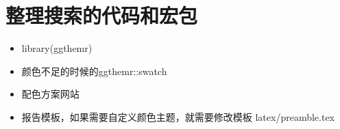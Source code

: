 \documentclass[hyperref, a4paper, UTF8, zihao = -4, linespread = 1]{ctexbook}
\newenvironment{Shaded}{\begin{snugshade}}{\end{snugshade}}
\newcommand{\DecValTok}[1]{\textcolor[rgb]{0.00,0.00,0.81}{#1}}
\newcommand{\NormalTok}[1]{#1}
\newcommand{\OperatorTok}[1]{\textcolor[rgb]{0.81,0.36,0.00}{\textbf{#1}}}
\newcommand{\StringTok}[1]{\textcolor[rgb]{0.31,0.60,0.02}{#1}}
\providecommand{\tightlist}{%
  \setlength{\itemsep}{0pt}\setlength{\parskip}{0pt}}
\begin{document}
\hypertarget{ux6574ux7406ux641cux7d22ux7684ux4ee3ux7801ux548cux5b8fux5305}{%
\section{整理搜索的代码和宏包}\label{ux6574ux7406ux641cux7d22ux7684ux4ee3ux7801ux548cux5b8fux5305}}

\begin{itemize}
\tightlist
\item
  library(ggthemr)
\item
  颜色不足的时候的ggthemr::swatch
\item
  配色方案网站
\item
  报告模板，如果需要自定义颜色主题，就需要修改模板 latex/preamble.tex
\end{itemize}

\begin{Shaded}
\end{Shaded}



\backmatter
\printindex
\end{document}
